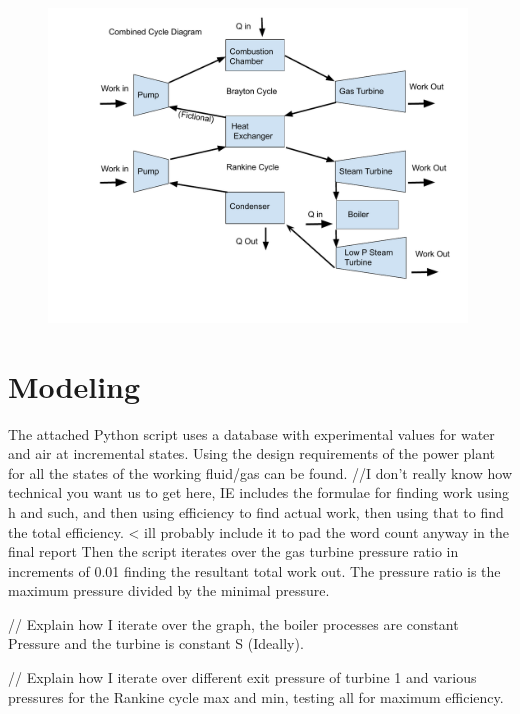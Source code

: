 \documentclass{article}
\begin{document}
\begin{figure}[!htbp]
\centering
  \includegraphics[page=1,trim=10mm 0mm 10mm 0mm,clip,width=0.99\textwidth]{Figures/Copy of Combined Cycle Diagram.pdf}
  \caption{}
  \label{fig:epsfig}
\end{figure}

\FloatBarrier

\section{Modeling}

The attached Python script uses a database with experimental values for water and air at incremental states. Using the design requirements of the power plant for all the states of the working fluid/gas can be found. //I don't really know how technical you want us to get here, IE includes the formulae for finding work using h and such, and then using efficiency to find actual work, then using that to find the total efficiency. < ill probably include it to pad the word count anyway in the final report
Then the script iterates over the gas turbine pressure ratio in increments of 0.01 finding the resultant total work out. The pressure ratio is the maximum pressure divided by the minimal pressure. 

// Explain how I iterate over the graph, the boiler processes are constant Pressure and the turbine is constant S (Ideally).

// Explain how I iterate over different exit pressure of turbine 1 and various pressures for the Rankine cycle max and min, testing all for maximum efficiency.
\end{document}
